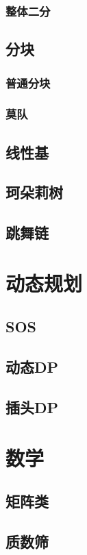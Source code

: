 \documentclass[twocolumn,a4]{article}
\newcommand{\addcpp}[1]{}
\begin{document}
		\subsubsection{整体二分}
	\subsection{分块}
		\subsubsection{普通分块}
		\subsubsection{莫队}
	\subsection{线性基}
	\subsection{珂朵莉树}
	\subsection{跳舞链}

\section{动态规划}
	\subsection{SOS}
	\subsection{动态DP}
	\subsection{插头DP}

\section{数学}
	\subsection{矩阵类}
	\subsection{质数筛}
\end{document}
